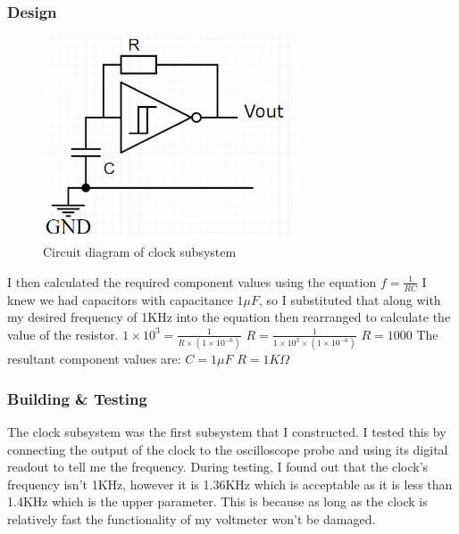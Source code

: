 \subsubsection{Design}
\begin{figure} [H]
    \centering
    \includegraphics[width=7.5cm]{images/clockCircuitDiagram.png}
    \caption{Circuit diagram of clock subsystem}
    \label{fig:clockCircuitDiagram}
\end{figure}
I then calculated the required component values using the equation  $\displaystyle f = \frac{1}{RC} $ \newline
I knew we had capacitors with capacitance $1\mu F$, so I substituted that along with my desired frequency of 1KHz into the equation then rearranged to calculate the value of the resistor.
\vspace{3mm} \newline
$\displaystyle 1\times10^{3} = \frac{1}{R\times(1\times10^{-6})}$\vspace{3mm} \newline
$\displaystyle R = \frac{1}{{1\times10^{3}}\times(1\times10^{-6})}$\vspace{3mm} \newline
$R = 1000$\vspace{1mm} \newline
\noindent The resultant component values are: \newline
\indent $C=1\mu F$\newline
\indent $R=1K\Omega$
\subsubsection{Building \& Testing}
The clock subsystem was the first subsystem that I constructed.
I tested this by connecting the output of the clock to the oscilloscope probe and using its digital readout to tell me the frequency.
During testing, I found out that the clock’s frequency isn’t 1KHz, however it is 1.36KHz which is acceptable as it is less than 1.4KHz which is the upper parameter. This is because as long as the clock is relatively fast the functionality of my voltmeter won’t be damaged.

